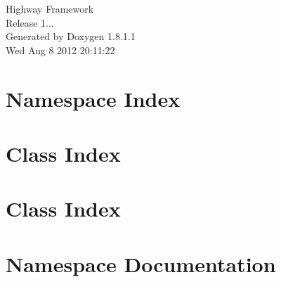 \documentclass{book}
\begin{document}
\hypersetup{pageanchor=false,citecolor=blue}
\begin{titlepage}
\vspace*{7cm}
\begin{center}
{\Large Highway Framework \\[1ex]\large Release 1... }\\
\vspace*{1cm}
{\large Generated by Doxygen 1.8.1.1}\\
\vspace*{0.5cm}
{\small Wed Aug 8 2012 20:11:22}\\
\end{center}
\end{titlepage}
\clearemptydoublepage
{}
\tableofcontents
\clearemptydoublepage
{}
\hypersetup{pageanchor=true,citecolor=blue}
\chapter{Namespace Index}

\chapter{Class Index}

\chapter{Class Index}

\chapter{Namespace Documentation}


















\end{document}

